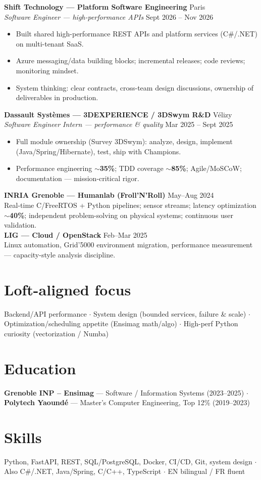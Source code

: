\documentclass[10pt,a4paper]{article}
\begin{document}
\textbf{Shift Technology --- Platform Software Engineering} \hfill Paris\\
\textit{Software Engineer --- high-performance APIs} \hfill Sept 2026 -- Nov 2026
\begin{itemize}
  \item Built shared high-performance REST APIs and platform services (C\#/.NET) on multi-tenant SaaS.
  \item Azure messaging/data building blocks; incremental releases; code reviews; monitoring mindset.
  \item System thinking: clear contracts, cross-team design discussions, ownership of deliverables in production.
\end{itemize}

\textbf{Dassault Syst\`emes --- 3DEXPERIENCE / 3DSwym R\&D} \hfill V\'elizy\\
\textit{Software Engineer Intern --- performance \& quality} \hfill Mar 2025 -- Sept 2025
\begin{itemize}
  \item Full module ownership (Survey 3DSwym): analyze, design, implement (Java/Spring/Hibernate), test, ship with Champions.
  \item Performance engineering $\sim$\textbf{35\%}; TDD coverage $\sim$\textbf{85\%}; Agile/MoSCoW; documentation --- mission-critical rigor.
\end{itemize}

\textbf{INRIA Grenoble --- Humanlab (Froll'N'Roll)} \hfill May--Aug 2024\\
Real-time C/FreeRTOS + Python pipelines; sensor streams; latency optimization $\sim$\textbf{40\%}; independent problem-solving on physical systems; continuous user validation.\\[1pt]
\textbf{LIG --- Cloud / OpenStack} \hfill Feb--Mar 2025\\
Linux automation, Grid'5000 environment migration, performance measurement --- capacity-style analysis discipline.

\section{Loft-aligned focus}
Backend/API performance $\cdot$ System design (bounded services, failure \& scale) $\cdot$ Optimization/scheduling appetite (Ensimag math/algo) $\cdot$ High-perf Python curiosity (vectorization / Numba)

\section{Education}
\textbf{Grenoble INP -- Ensimag} --- Software / Information Systems (2023--2025) $\cdot$
\textbf{Polytech Yaound\'e} --- Master's Computer Engineering, Top 12\% (2019--2023)

\section{Skills}
Python, FastAPI, REST, SQL/PostgreSQL, Docker, CI/CD, Git, system design $\cdot$ Also C\#/.NET, Java/Spring, C/C++, TypeScript $\cdot$ EN bilingual / FR fluent
\end{document}
